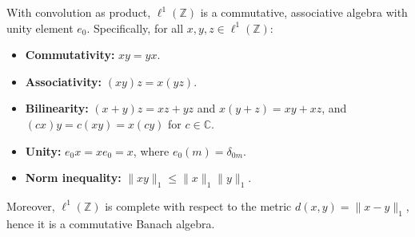 With convolution as product, $\ell^1(\mathbb{Z})$ is a commutative, associative algebra with unity element $e_0$. Specifically, for all $x, y, z \in \ell^1(\mathbb{Z})$:
\begin{itemize}
\item \textbf{Commutativity:} $xy = yx$.
\item \textbf{Associativity:} $(xy)z = x(yz)$.
\item \textbf{Bilinearity:} $(x + y)z = xz + yz$ and $x(y + z) = xy + xz$, and $(cx)y = c(xy) = x(cy)$ for $c \in \mathbb{C}$.
\item \textbf{Unity:} $e_0 x = x e_0 = x$, where $e_0(m) = \delta_{0m}$.
\item \textbf{Norm inequality:} $\|xy\|_1 \leq \|x\|_1 \|y\|_1$.
\end{itemize}
Moreover, $\ell^1(\mathbb{Z})$ is complete with respect to the metric $d(x, y) = \|x - y\|_1$, hence it is a commutative Banach algebra.
